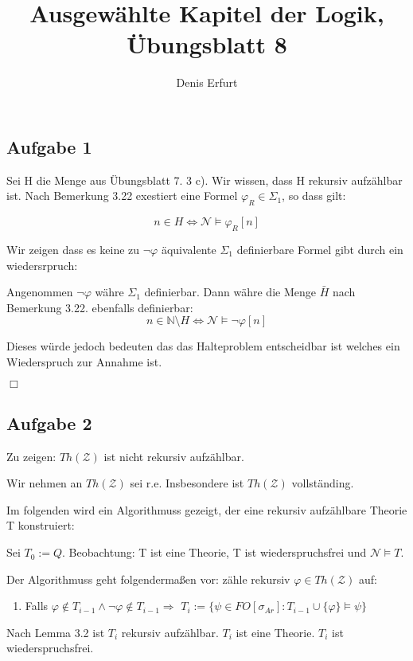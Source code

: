 \documentclass[12pt]{article}
\begin{document}
\title{Ausgewählte Kapitel der Logik, Übungsblatt 8}
\author{Denis Erfurt}
\maketitle



\subsection*{Aufgabe 1}
Sei H die Menge aus Übungsblatt 7. 3 c).
Wir wissen, dass H rekursiv aufzählbar ist. Nach Bemerkung 3.22 exestiert eine
Formel $\varphi_R\in\Sigma_1$, so dass gilt:

\begin{equation}
  n\in H \Leftrightarrow \mathcal{N}\models \varphi_R[n]
\end{equation}

Wir zeigen dass es keine zu $\neg\varphi$ äquivalente $\Sigma_1$ definierbare
Formel gibt durch ein wiedersrpruch:

Angenommen $\neg\varphi$ währe $\Sigma_1$ definierbar.
Dann währe die Menge $\bar H$ nach Bemerkung 3.22. ebenfalls definierbar:
\begin{equation}
  n\in \mathbb{N}\setminus H \Leftrightarrow \mathcal{N}\models\neg\varphi[n]
\end{equation}

Dieses würde jedoch bedeuten das das Halteproblem entscheidbar ist welches ein
Wiederspruch zur Annahme ist.

\begin{flushright} $\Box$ \end{flushright}


\subsection*{Aufgabe 2}
Zu zeigen: $Th(\mathcal{Z})$ ist nicht rekursiv aufzählbar.

Wir nehmen an $Th(\mathcal{Z})$ sei r.e.
Insbesondere ist $Th(\mathcal{Z})$ vollständing.

Im folgenden wird ein Algorithmuss gezeigt, der eine rekursiv aufzählbare
Theorie T konstruiert:

Sei $T_0:=Q$.
Beobachtung: T ist eine Theorie, T ist wiederspruchsfrei und $\mathcal{N}\models T$.

Der Algorithmuss geht folgendermaßen vor: zähle rekursiv $\varphi\in
Th(\mathcal{Z})$ auf:
\begin{enumerate}
  \item Falls $\varphi\notin T_{i-1} \land \neg\varphi\notin T_{i-1} \Rightarrow$
    $T_i:= \{\psi\in FO[\sigma_{Ar}]: T_{i-1}\cup\{\varphi\}\models\psi\}$
\end{enumerate}
Nach Lemma 3.2 ist $T_i$ rekursiv aufzählbar.
$T_i$ ist eine Theorie.
$T_i$ ist wiederspruchsfrei.
\end{document}
